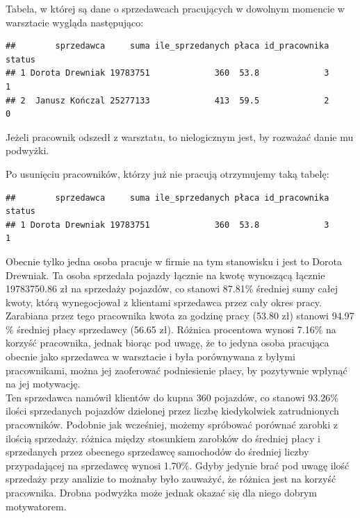 \documentclass{article}\usepackage[]{graphicx}\usepackage[]{xcolor}
\makeatletter
\newenvironment{kframe}{%
 \def\at@end@of@kframe{}%
 \ifinner\ifhmode%
  \def\at@end@of@kframe{\end{minipage}}%
  \begin{minipage}{\columnwidth}%
 \fi\fi%
 \def\FrameCommand##1{\hskip\@totalleftmargin \hskip-\fboxsep
 \colorbox{shadecolor}{##1}\hskip-\fboxsep
     \hskip-\linewidth \hskip-\@totalleftmargin \hskip\columnwidth}%
 \MakeFramed {\advance\hsize-\width
   \@totalleftmargin\z@ \linewidth\hsize
   \@setminipage}}%
 {\par\unskip\endMakeFramed%
 \at@end@of@kframe}
\newenvironment{knitrout}{}{} %
\makeatother
\begin{document}
Tabela, w której są dane o sprzedawcach  pracujących w dowolnym momencie w warsztacie wygląda następująco:

\begin{knitrout}
\color{fgcolor}\begin{kframe}
\begin{verbatim}
##        sprzedawca     suma ile_sprzedanych płaca id_pracownika status
## 1 Dorota Drewniak 19783751             360  53.8             3      1
## 2  Janusz Kończal 25277133             413  59.5             2      0
\end{verbatim}
\end{kframe}
\end{knitrout}

Jeżeli pracownik odszedł z warsztatu, to nielogicznym jest, by rozważać danie mu podwyżki.

Po usunięciu pracowników, którzy już nie pracują otrzymujemy taką tabelę:

\begin{knitrout}
\color{fgcolor}\begin{kframe}
\begin{verbatim}
##        sprzedawca     suma ile_sprzedanych płaca id_pracownika status
## 1 Dorota Drewniak 19783751             360  53.8             3      1
\end{verbatim}
\end{kframe}
\end{knitrout}

Obecnie tylko jedna osoba pracuje w firmie na tym stanowisku i jest to Dorota Drewniak. Ta osoba sprzedała pojazdy łącznie na kwotę wynoszącą łącznie 19783750.86 zł na sprzedaży pojazdów, co stanowi 87.81\% średniej sumy całej kwoty, którą wynegocjował z klientami sprzedawca przez cały okres pracy. Zarabiana przez tego pracownika kwota za godzinę pracy (53.80 zł) stanowi 94.97 \% średniej płacy sprzedawcy (56.65 zł). Różnica procentowa wynosi 7.16\% na korzyść pracownika, jednak biorąc pod uwagę, że to jedyna osoba pracująca obecnie jako sprzedawca w warsztacie i była porównywana z byłymi pracownikami, można jej zaoferować podniesienie płacy, by pozytywnie wpłynąć na jej motywację. \\

Ten sprzedawca namówił klientów do kupna 360 pojazdów, co stanowi 93.26\% ilości sprzedanych pojazdów dzielonej przez liczbę kiedykolwiek zatrudnionych pracowników. Podobnie jak wcześniej, możemy spróbować porównać zarobki z ilością sprzedaży. różnica między stosunkiem zarobków do średniej płacy i sprzedanych przez obecnego sprzedawcę samochodów do średniej liczby przypadającej na sprzedawcę  wynosi 1.70\%. Gdyby jedynie brać pod uwagę ilość sprzedaży przy analizie to możnaby było zauważyć, że różnica jest na korzyść pracownika. Drobna podwyżka może jednak okazać się dla niego dobrym motywatorem. 
\end{document}
